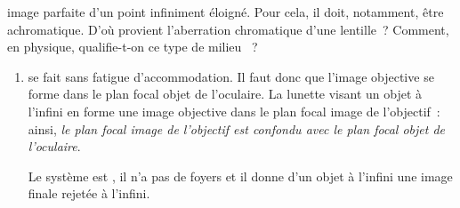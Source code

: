 \documentclass[a4paper, 10pt, garamond, oneside]{book}
\begin{document}
{\begin{enumerate}
		      image parfaite d'un point infiniment éloigné. Pour cela, il doit,
		      notamment, être achromatique. D'où provient l'aberration chromatique
		      d'une lentille~? Comment, en physique, qualifie-t-on ce type de milieu
		      ~?
	\end{enumerate}
}{
	\begin{enumerate}
		\item {} se fait sans fatigue
		      d'accommodation. Il faut donc que l'image objective se forme dans le
		      plan focal objet de l'oculaire. La lunette visant un objet à l'infini
		      en forme une image objective dans le plan focal image de l'objectif~:
		      ainsi, \emph{le plan focal image de l'objectif est confondu avec le
			      plan focal objet de l'oculaire}.

		      Le système est , il n'a pas de foyers et il donne
		      d'un objet à l'infini une image finale rejetée à l'infini.


\end{enumerate}}
\end{document}
